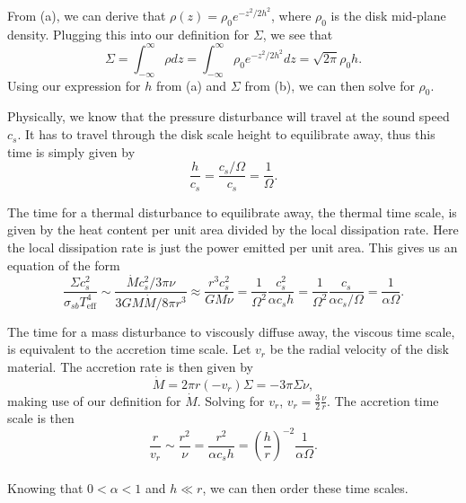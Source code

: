 \documentclass[11pt]{article}
\newenvironment{tight_enumerate}{
    \begin{enumerate}[label=(\alph*)]
    \setlength{\itemsep}{3pt}
    \setlength{\parskip}{0pt}}
    {\end{enumerate}}
\begin{document}
\begin{tight_enumerate}
\item From (a), we can derive that $\rho(z) = \rho_{0}e^{-z^2/2h^2}$, where $\rho_0$ is the disk mid-plane density. Plugging this into our definition for $\Sigma$, we see that 
\[\Sigma = \int_{-\infty}^{\infty}{\rho}dz = \int_{-\infty}^{\infty}\rho_{0}e^{-z^2/2h^2}dz = \sqrt{2\pi}\rho_{0}h.\]
Using our expression for $h$ from (a) and $\Sigma$ from (b), we can then solve for $\rho_0$.\\

\item Physically, we know that the pressure disturbance will travel at the sound speed $c_s$. It has to travel through the disk scale height to equilibrate away, thus this time is simply given by 
\[\frac{h}{c_s} = \frac{c_s/\Omega}{c_s} = \frac{1}{\Omega}.\]

\item The time for a thermal disturbance to equilibrate away, the thermal time scale, is given by the heat content per unit area divided by the local dissipation rate. Here the local dissipation rate is just the power emitted per unit area. This gives us an equation of the form
\[\frac{\Sigma{c_s^2}}{{\sigma_{sb}}T_\text{eff}^4} \sim \frac{\dot{M}c_s^2/3\pi\nu}{3GM\dot{M}/8{\pi}r^3} \approx \frac{r^{3}c_s^2}{GM\nu} = \frac{1}{\Omega^2}\frac{c_s^2}{\alpha{c_s}h} = \frac{1}{\Omega^2}\frac{c_s}{\alpha{c_s}/\Omega} = \frac{1}{\alpha\Omega}.\]

\item The time for a mass disturbance to viscously diffuse away, the viscous time scale, is equivalent to the accretion time scale. Let $v_r$ be the radial velocity of the disk material. The accretion rate is then given by 
\[\dot{M} = 2\pi{r}(-v_r)\Sigma = -3\pi\Sigma\nu,\]
making use of our definition for $\dot{M}$. Solving for $v_r$, $v_r = \frac{3}{2}\frac{\nu}{r}$. The accretion time scale is then 
\[\frac{r}{v_r} \sim \frac{r^2}{\nu} = \frac{r^2}{\alpha{c_s}h} = \left(\frac{h}{r}\right)^{-2}\frac{1}{\alpha\Omega}.\]
\\
Knowing that $0 < \alpha < 1$ and $h \ll r$, we can then order these time scales.\\


\end{tight_enumerate}
\end{document}
